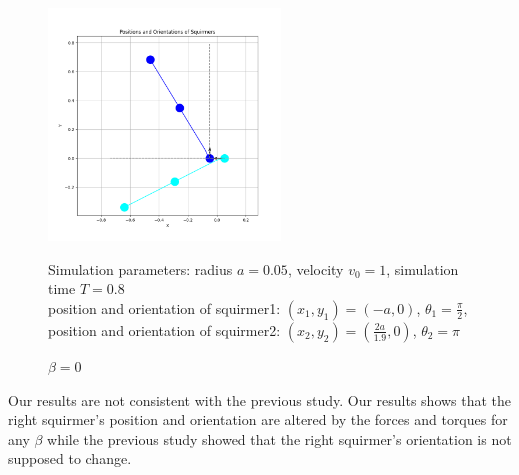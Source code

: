 \documentclass{article}
\begin{document}
\begin{figure}[H]
\begin{minipage}{0.49\textwidth}
        \caption{\footnotesize $\beta = 3$}
    \end{minipage}
    \includegraphics[width=0.55\textwidth]{graphs/simulations/sim_sq_sq/beta0/pi_.png}
    \caption{\footnotesize $\beta = 0$}
    Simulation parameters: radius $a=0.05$, velocity $v_0=1$, simulation time $T=0.8$\\
        position and orientation of squirmer1: $(x_1,y_1)=(-a,0)$, $\theta_1=\frac{\pi}{2}$,\\
        position and orientation of squirmer2: $(x_2,y_2)=(\frac{2a}{1.9},0)$, $\theta_2=\pi$
\end{figure}
Our results are not consistent with the previous study\cite{Stark}. Our results shows that the right squirmer's position
and orientation are altered by the forces and torques for any $\beta$ while the previous study showed that the right squirmer's
orientation is not supposed to change.
\end{document}
